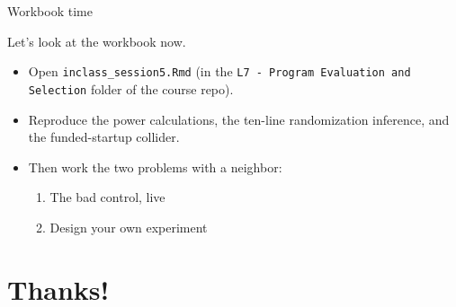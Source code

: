 \documentclass[aspectratio=169,11pt]{beamer}
\begin{document}
\begin{frame}{Workbook time}
\begin{center}
{\LARGE \alert{Let's look at the workbook now.}}
\end{center}
\bigskip
\begin{itemize}
	\item Open \texttt{inclass\_session5.Rmd} (in the \texttt{L7 - Program Evaluation and Selection} folder of the course repo).
	\item Reproduce the power calculations, the ten-line randomization inference, and the funded-startup collider.
	\item Then work the two problems with a neighbor:
	\begin{enumerate}
		\item The bad control, live
		\item Design your own experiment
	\end{enumerate}
\end{itemize}
\end{frame}


\section{Thanks!}
\end{document}
